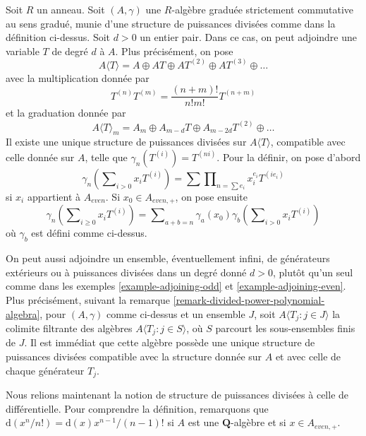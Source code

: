 \begin{example}
\label{example-adjoining-even}
Soit $R$ un anneau. Soit $(A, \gamma)$ une $R$-algèbre graduée strictement
commutative au sens gradué, munie d'une structure de puissances divisées
comme dans la définition ci-dessus. Soit $d > 0$ un entier pair. Dans ce cas,
on peut adjoindre une variable $T$ de degré $d$ à $A$. Plus précisément, on
pose
$$
A\langle T \rangle = A \oplus AT \oplus AT^{(2)} \oplus AT^{(3)} \oplus \ldots
$$
avec la multiplication donnée par
$$
T^{(n)} T^{(m)} = \frac{(n + m)!}{n!m!} T^{(n + m)}
$$
et la graduation donnée par
$$
A\langle T \rangle_m =
A_m \oplus A_{m - d}T \oplus A_{m - 2d}T^{(2)} \oplus \ldots
$$
Il existe une unique structure de puissances divisées sur
$A\langle T \rangle$, compatible avec celle donnée sur $A$, telle que
$\gamma_n(T^{(i)}) = T^{(ni)}$. Pour la définir, on pose d'abord
$$
\gamma_n\left(\sum\nolimits_{i > 0} x_i T^{(i)}\right) =
\sum \prod\nolimits_{n = \sum e_i} x_i^{e_i} T^{(ie_i)}
$$
si $x_i$ appartient à $A_{even}$. Si $x_0 \in A_{even, +}$, on pose ensuite
$$
\gamma_n\left(\sum\nolimits_{i \geq 0} x_i T^{(i)}\right) =
\sum\nolimits_{a + b = n}
\gamma_a(x_0)\gamma_b\left(\sum\nolimits_{i > 0} x_iT^{(i)}\right)
$$
où $\gamma_b$ est défini comme ci-dessus.
\end{example}

\begin{remark}
\label{remark-adjoining-set-of-variables}
On peut aussi adjoindre un ensemble, éventuellement infini, de générateurs
extérieurs ou à puissances divisées dans un degré donné $d > 0$, plutôt qu'un
seul comme dans les exemples \ref{example-adjoining-odd} et
\ref{example-adjoining-even}. Plus précisément, suivant la remarque
\ref{remark-divided-power-polynomial-algebra}, pour $(A,\gamma)$ comme
ci-dessus et un ensemble $J$, soit $A\langle
T_j:j\in J\rangle$ la colimite filtrante des algèbres
$A\langle T_j:j\in S\rangle$, où $S$ parcourt les
sous-ensembles finis de $J$. Il est immédiat que cette algèbre possède une
unique structure de puissances divisées compatible avec la structure donnée
sur $A$ et avec celle de chaque générateur $T_j$.
\end{remark}

\noindent
Nous relions maintenant la notion de structure de puissances divisées à
celle de différentielle. Pour comprendre la définition, remarquons que
$\text{d}(x^n/n!) = \text{d}(x) x^{n - 1}/(n - 1)!$ si $A$ est une
$\mathbf{Q}$-algèbre et si $x \in A_{even, +}$.

